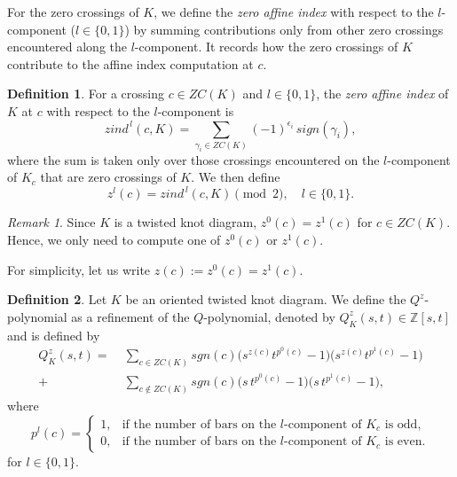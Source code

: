 \documentclass[10pt,a4paper,reqno]{amsart}
\theoremstyle{definition}
\newtheorem{definition}{Definition}[section]
\theoremstyle{remark}
\newtheorem{remark}[theorem]{Remark}
\begin{document}
	For the zero crossings of $K$, we define the {\it zero affine index} with respect to the $l$-component ($l\in \{0,1\}$) by summing contributions only from other zero crossings encountered along the $l$-component. It records how 
	the zero crossings of $K$ contribute to the affine index computation 
	at $c$.
	
	\begin{definition}
		For a crossing $c \in ZC(K)$ and $l \in \{0,1\}$, the 
		\emph{zero affine index} of $K$ at $c$ with respect to the 
		$l$-component is
		\[
		zind^{\,l}(c,K) =  \sum_{\gamma_{i} \in ZC(K)} (-1)^{\epsilon_{i}}\,sign(\gamma_{i}),
		\]
		 where the sum is taken only over those crossings encountered on 
		the $l$-component of $K_{c}$ that are zero crossings of $K$. We then 
		define
		\[
		z^l(c) = zind^{\,l}(c,K)\pmod{2},\quad l \in \{0,1\}.
		\]
	\end{definition}

		\begin{remark}
		Since  $K$ is a twisted knot diagram, $z^{0}(c)=z^{1}(c)$ for $ c \in ZC(K)$. Hence, we only need to compute one of  $z^{0}(c)$ or $z^{1}(c)$. 
	\end{remark}
	For simplicity, let us write $z(c):=z^{0}(c)=z^{1}(c)$.

	\begin{definition}
		Let $K$ be an oriented twisted knot diagram. We define the $Q^z$-polynomial as a refinement of the $Q$-polynomial, denoted by $Q^{z}_{K}(s,t) \in \mathbb{Z}[s,t]$ and is defined by
		\begin{align*}
				Q^{z}_{K}(s,t) 
				=\; & \sum_{c \in ZC(K)} 
				sgn(c)\bigl(s^{z(c)}t^{p^{0}(c)}-1\bigr)
				\bigl(s^{z(c)}t^{p^{1}(c)}-1\bigr) \\
				+\; & \sum_{c \notin ZC(K)} 
				sgn(c)\bigl(s\,t^{p^{0}(c)}-1\bigr)
				\bigl(s\,t^{p^{1}(c)}-1\bigr),
			\end{align*}
			where
			\[
			p^{l}(c) =
			\begin{cases}
				1, & \text{if the number of bars on the $l$-component 
					of $K_{c}$ is odd},\\
				0, & \text{if the number of bars on the $l$-component 
					of $K_{c}$ is even}.
			\end{cases}
			\]
			 for $l \in \{0,1\}$.
	\end{definition}
	
	
	
\end{document}
